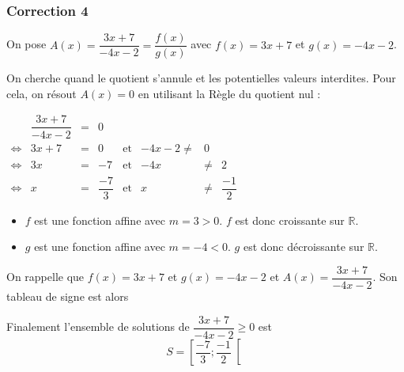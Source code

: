 \documentclass[15pt, mathserif]{beamer}
\begin{document}
\begin{frame}
\vspace{-10mm}
	\frametitle{Correction 4}
\vspace*{1cm} 
  On pose $A(x) = \dfrac{3x+7}{-4x-2} = \dfrac{f(x)}{g(x)}$ avec $f(x) = 3x+7$ et $g(x) = -4x-2$.

 On cherche quand le quotient s'annule et les potentielles valeurs interdites. Pour cela, on résout $A(x)=0$ en utilisant la Règle du quotient nul : 
 
 $\begin{array}{crclcrcl} 
 
 	  & \dfrac{3x+7}{-4x-2} & = & 0 \\ 
 	  \Leftrightarrow & 3x+7 & =& 0 & \text{et} & -4x-2\neq & 0 \\ 
 	 \Leftrightarrow & 3x&=&-7& \text{et} & -4x & \neq & 2 \\ 
 	 \Leftrightarrow & x&=&\dfrac{-7}{3} & \text{et} & x &\neq&\dfrac{-1}{2}
 
 \end{array}$ 
 	 \begin{itemize} 
	\item  $f$ est une fonction affine avec $m =3>0$. $f$ est donc croissante sur $\mathbb{R}$.
	\item $g$ est une fonction affine avec $m =-4<0$. $g$ est donc décroissante sur $\mathbb{R}$.

	 \end{itemize}

 \end{frame}


\begin{frame}On rappelle que $f(x) = 3x+7$ et $g(x) = -4x-2$ et $A(x) = \dfrac{3x+7}{-4x-2}$. Son tableau de signe est alors 

\medskip \hfil
{}

 Finalement l'ensemble de solutions de $\dfrac{3x+7}{-4x-2}\geq0$ est\[S = \left[\dfrac{-7}{3};\dfrac{-1}{2}\right[\]

\end{frame}
\end{document}
